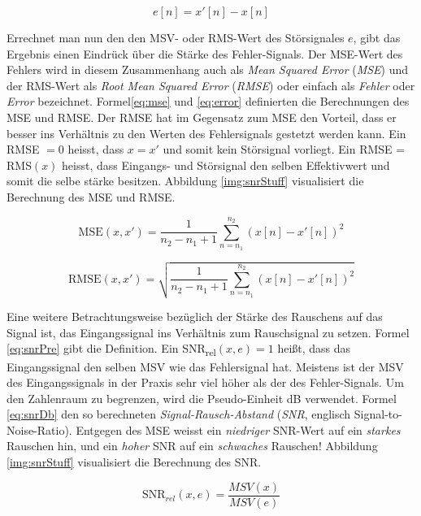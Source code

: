 \begin{equation}
e[n] = x'[n] -x[n]
\label{eq:calErrorSig}
\end{equation}

 Errechnet man nun den den MSV- oder RMS-Wert des Störsignales $e$, gibt das Ergebnis einen Eindrück über die \glqq Stärke \grqq{} des Fehler-Signals. Der MSE-Wert des Fehlers wird in diesem Zusammenhang auch als \emph{Mean Squared Error} (\emph{MSE}) und der RMS-Wert als \emph{Root Mean Squared Error} (\emph{RMSE}) oder einfach als \emph{Fehler} oder \emph{Error} bezeichnet. Formel\ref{eq:mse} und \ref{eq:error} definierten die Berechnungen des MSE und RMSE. Der RMSE hat im Gegensatz zum MSE den Vorteil, dass er besser ins Verhältnis zu den Werten des Fehlersignals gestetzt werden kann. Ein RMSE $= 0$ heisst, dass $x = x'$ und somit kein Störsignal vorliegt. Ein RMSE = RMS$(x)$ heisst, dass Eingangs- und Störsignal den selben Effektivwert und somit die selbe \glqq stärke\grqq{} besitzen. Abbildung \ref{img:snrStuff} visualisiert die Berechnung des MSE und RMSE. \cite[S: 28 - 29]{dspMichigan}

\begin{equation}
\text{MSE}(x,x') = \frac{1}{n_2 - n_1 + 1} \sum_{n = n_1}^{n_2} (x[n]-x'[n])^2
\label{eq:mse}
\end{equation}

\begin{equation}
\text{RMSE}(x,x') = \sqrt{\frac{1}{n_2 - n_1 + 1} \sum_{n = n_1}^{n_2} (x[n]-x'[n])^2}
\label{eq:error}
\end{equation}

Eine weitere Betrachtungsweise bezüglich der Stärke des Rauschens auf das Signal ist, das Eingangssignal ins Verhältnis zum Rauschsignal zu setzen. Formel \ref{eq:snrPre} gibt die Definition. Ein SNR\textsubscript{rel}$(x,e) = 1$ heißt, dass das Eingangssignal den selben MSV wie das Fehlersignal hat. Meistens ist der MSV des Eingangssignals in der Praxis sehr viel höher als der des Fehler-Signals. Um den Zahlenraum zu begrenzen, wird die Pseudo-Einheit dB verwendet. Formel \ref{eq:snrDb} den so berechneten \emph{Signal-Rausch-Abstand} (\emph{SNR}, englisch Signal-to-Noise-Ratio). Entgegen des MSE weisst ein \emph{niedriger} SNR-Wert auf ein \emph{starkes} Rauschen hin, und ein \emph{hoher} SNR auf ein \emph{schwaches} Rauschen! Abbildung \ref{img:snrStuff} visualisiert die Berechnung des SNR.


\begin{equation}
\text{SNR}_{rel}(x,e) = \frac{MSV(x)}{MSV(e)}
\label{eq:snrPre}
\end{equation}

